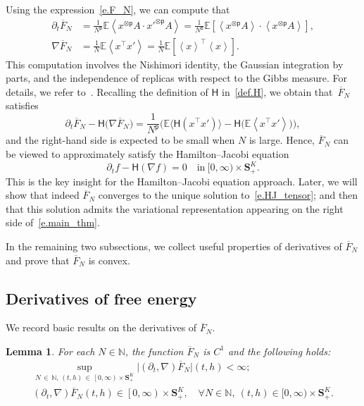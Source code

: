 \documentclass[10pt]{amsart}
\newtheorem{lemm}[theo]{Lemma}\newtheorem{prop}[theo]{Proposition}\newtheorem{coro}[theo]{Corollary}\newtheorem{conj}[theo]{Conjecture}
\theoremstyle{definition}\newtheorem{defi}[theo]{Definition}\newtheorem{rema}[theo]{Remark}\newtheorem{exam}[theo]{Example}\newtheorem{exem}[theo]{Example}\newtheorem{nota}[theo]{Notation}
\newcommand{\N}{\mathbb{N}}
\newcommand{\E}{\mathbb{E}}
\renewcommand{\S}{\mathbf{S}}
\renewcommand{\H}{\mathsf{H}}
\newcommand{\sfp}{\mathsf{p}}
\renewcommand{\bar}{\overline}
\newcommand{\dr}{\partial}
\newcommand{\la}{\left\langle}
\newcommand{\ra}{\right\rangle}
\let\oldforall\forall
\renewcommand*{\forall}{\mathrel{\oldforall}}
\begin{document}
Using the expression~\eqref{e.F_N}, we can compute that
\begin{align}
\dr_t \bar F_N &= \frac{1}{N^{\sfp}} \E \la x^{\otimes \sfp}A \cdot x'^{\otimes\sfp} A \ra=\frac{1}{N^{\sfp}} \E\left[\la x^{\otimes \sfp}A \ra \cdot \la x^{\otimes\sfp} A \ra\right],\label{e.dt_F_N}
\\
\nabla \bar F_N &= \frac 1 N \E \la x^\intercal x' \ra = \frac{1}{N}\E\left[\la x \ra^\intercal \la x \ra\right].\label{e.grad_F_N}
\end{align}
This computation involves the Nishimori identity, the Gaussian integration by parts, and the independence of replicas with respect to the Gibbs measure. For details, we refer to~\cite[(3.5)-(3.6)]{HBJ}. Recalling the definition of $\H$ in~\eqref{def.H}, we obtain that~$\bar F_N$ satisfies
\begin{equation*}
\partial_t \bar F_N - \H\big(\nabla \bar F_N\big) = \frac{1}{N^\sfp}\bigg(\E\big\langle\H\left(x^\intercal x'\right) \big\rangle - \H\big(\E\left\langle x^\intercal x'\right\rangle \big)\bigg),
\end{equation*}
and the right-hand side is expected to be small when $N$ is large. Hence, $\bar F_N$ can be viewed to approximately satisfy the Hamilton--Jacobi equation
\begin{equation}\label{e.HJ_tensor}
\partial_t f - \H(\nabla f)=0 \quad\text{in}\ [0,\infty)\times \S^K_+.
\end{equation}
This is the key insight for the Hamilton--Jacobi equation approach. Later, we will show that indeed $\bar F_N$ converges to the unique solution to~\eqref{e.HJ_tensor}; and then that this solution admits the variational representation appearing on the right side of~\eqref{e.main_thm}.


In the remaining two subsections, we collect useful properties of derivatives of $\bar F_N$ and prove that $\bar F_N$ is convex.


\subsection{Derivatives of free energy}

We record basic results on the derivatives of $\bar F_N$.

\begin{lemm}\label{l.lip_unif_N}
For each $N\in\N$, the function $\bar F_N$ is $C^1$ and the following holds:
\begin{gather*}
\sup_{N\,\in\,\N,\, (t,h)\,\in\, \left[0,\infty\right)\times \S^K_+}\big|\left(\partial_t, \nabla\right)\bar F_N\big|(t,h)<\infty;\\
\left(\partial_t, \nabla\right)\bar F_N(t,h)\in \left[0,\infty\right)\times \S^K_+,\quad\forall N\in\N,\ (t,h)\in [0,\infty)\times \S^K_+.
\end{gather*}
\end{lemm}
\end{document}
